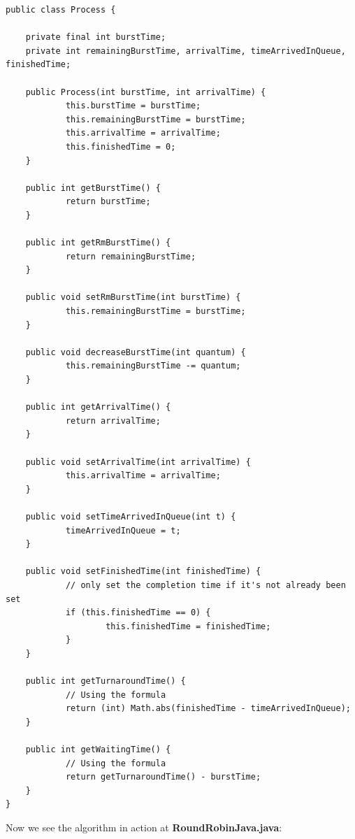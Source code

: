 \documentclass[12pt]{article}
\begin{document}
\begin{lstlisting}
public class Process {

	private final int burstTime;
	private int remainingBurstTime, arrivalTime, timeArrivedInQueue, finishedTime;

	public Process(int burstTime, int arrivalTime) {
			this.burstTime = burstTime;
			this.remainingBurstTime = burstTime;
			this.arrivalTime = arrivalTime;
			this.finishedTime = 0;
	}

	public int getBurstTime() {
			return burstTime;
	}

	public int getRmBurstTime() {
			return remainingBurstTime;
	}

	public void setRmBurstTime(int burstTime) {
			this.remainingBurstTime = burstTime;
	}

	public void decreaseBurstTime(int quantum) {
			this.remainingBurstTime -= quantum;
	}

	public int getArrivalTime() {
			return arrivalTime;
	}

	public void setArrivalTime(int arrivalTime) {
			this.arrivalTime = arrivalTime;
	}

	public void setTimeArrivedInQueue(int t) {
			timeArrivedInQueue = t;
	}

	public void setFinishedTime(int finishedTime) {
			// only set the completion time if it's not already been set
			if (this.finishedTime == 0) {
					this.finishedTime = finishedTime;
			}
	}

	public int getTurnaroundTime() {
			// Using the formula
			return (int) Math.abs(finishedTime - timeArrivedInQueue);
	}

	public int getWaitingTime() {
			// Using the formula
			return getTurnaroundTime() - burstTime;
	}
}
\end{lstlisting}

Now we see the algorithm in action at \textbf{RoundRobinJava.java}:
\end{document}
